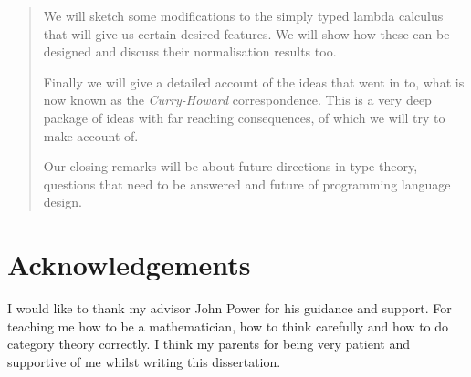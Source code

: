 \documentclass{article}
\theoremstyle{definition}
\begin{document}
\begin{abstract}
We will sketch some modifications to the simply typed lambda calculus that will give us certain desired features. We will show how these can be designed and discuss their normalisation results too.

Finally we will give a detailed account of the ideas that went in to, what is now known as the \emph{Curry-Howard} correspondence. This is a very deep package of ideas with far reaching consequences, of which we will try to make account of.

Our closing remarks will be about future directions in type theory, questions that need to be answered and future of programming language design.
\end{abstract}
\newpage

\tableofcontents
\newpage

\section*{Acknowledgements}
I would like to thank my advisor John Power for his guidance and support. For teaching me how to be a mathematician, how to think carefully and how to do category theory correctly. I think my parents for being very patient and supportive of me whilst writing this dissertation.

\newpage

\setcounter{page}{1}



















\newpage
 

\end{document}
